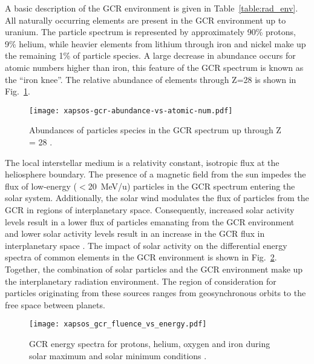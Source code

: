 A basic description of the GCR environment is given in Table~\ref{table:rad_env}.
All naturally occurring elements are present in the GCR environment up to uranium.
The particle spectrum is represented by approximately 90\% protons, 9\% helium, while heavier elements from lithium through iron and nickel make up the remaining 1\% of particle species.
A large decrease in abundance occurs for atomic numbers higher than iron, this feature of the GCR spectrum is known as the ``iron knee''.
The relative abundance of elements through Z=28 is shown in Fig.~\ref{fig:gcr-abundance-vs-atomic-num}.
\begin{figure}[htbp]
    \begin{center}
        \texttt{[image: xapsos-gcr-abundance-vs-atomic-num.pdf]}
    \end{center}
    \caption[Abundances of particles species in the GCR spectrum up through Z = 28.]{Abundances of particles species in the GCR spectrum up through Z = 28 \cite{xapsos:2006}.}
    \label{fig:gcr-abundance-vs-atomic-num}
\end{figure}

The local interstellar medium is a relativity constant, isotropic flux at the heliosphere boundary.
The presence of a magnetic field from the sun impedes the flux of low-energy ($<$20~MeV/u) particles in the GCR spectrum entering the solar system.
Additionally, the solar wind modulates the flux of particles from the GCR in regions of interplanetary space.
Consequently, increased solar activity levels result in a lower flux of particles emanating from the GCR environment and lower solar activity levels result in an increase in the GCR flux in interplanetary space \cite{parker1965passage,badhwar1992improved}.
The impact of solar activity on the differential energy spectra of common elements in the GCR environment is shown in Fig.~\ref{fig:gcr-fluence-vs-energy}.
Together, the combination of solar particles and the GCR environment make up the interplanetary radiation environment.
The region of consideration for particles originating from these sources ranges from geosynchronous orbits to the free space between planets.

\begin{figure}[tb]
    \begin{center}
        \texttt{[image: xapsos\_gcr\_fluence\_vs\_energy.pdf]}
    \end{center}
    \caption[GCR energy spectra for protons, helium, oxygen and iron during solar maximum and solar minimum conditions.]{GCR energy spectra for protons, helium, oxygen and iron during solar maximum and solar minimum conditions \cite{badhwar1996galactic}.}
    \label{fig:gcr-fluence-vs-energy}
\end{figure}

